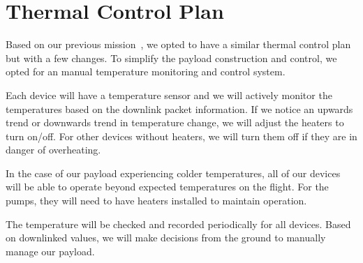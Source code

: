 \section{Thermal Control Plan}
\label{sec:TCP}
Based on our previous mission~\cite{SORA}, we opted to have a similar thermal control plan but with a few changes.  To simplify the payload construction and control, we opted for an manual temperature monitoring and control system.  

Each device will have a temperature sensor and we will actively monitor the temperatures based on the downlink packet information.  If we notice an upwards trend or downwards trend in temperature change, we will adjust the heaters to turn on/off.  For other devices without heaters, we will turn them off if they are in danger of overheating.

In the case of our payload experiencing colder temperatures, all of our devices will be able to operate beyond expected temperatures on the flight.  For the pumps, they will need to have heaters installed to maintain operation.

The temperature will be checked and recorded periodically for all devices.  Based on downlinked values, we will make decisions from the ground to manually manage our payload.

